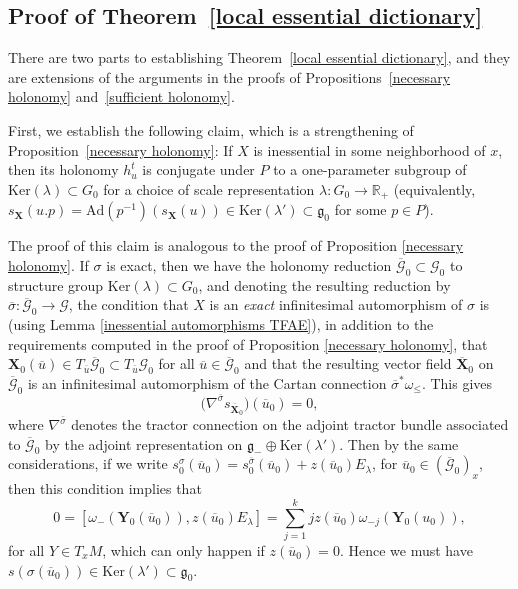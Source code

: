 \documentclass[pdftex]{sigma}
\def\R{\mathbb{R}}
\def\g{\mathfrak{g}}
\def\Gbdle{\mathcal{G}}
\def\dsum{\oplus}
\theoremstyle{plain}
\theoremstyle{definition}
\begin{document}
\subsection{Proof of Theorem~\ref{local essential dictionary}} \label{section4.3}

There are two parts to establishing Theorem~\ref{local essential dictionary}, and they are extensions of the arguments in the proofs of Propositions~\ref{necessary holonomy} and~\ref{sufficient holonomy}.

First, we establish the following claim, which is a strengthening of Proposition~\ref{necessary holonomy}: If $X$ is inessential in some neighborhood of $x$, then its holonomy $h_u^t$ is conjugate under $P$ to a one-parameter subgroup of $\mathrm{Ker}(\lambda) \subset G_0$ for a choice of scale representation $\lambda: G_0 \rightarrow \R_+$ (equivalently, $s_{\mathbf{X}}(u.p) = \mathrm{Ad}(p^{-1})(s_{\mathbf{X}}(u)) \in \mathrm{Ker}(\lambda') \subset \g_0$ for some $p \in P$).

The proof of this claim is analogous to the proof of Proposition \ref{necessary holonomy}. If $\sigma$ is exact, then we have the holonomy reduction $\overline{\Gbdle}_0 \subset \Gbdle_0$ to structure group $\mathrm{Ker}(\lambda) \subset G_0$, and denoting the resulting reduction by $\overline{\sigma}: \overline{\Gbdle}_0 \rightarrow \Gbdle$, the condition that $X$ is an \emph{exact} inf\/initesimal automorphism of $\sigma$ is (using Lemma \ref{inessential automorphisms TFAE}), in addition to the requirements computed in the proof of Proposition \ref{necessary holonomy}, that $\mathbf{X}_0(\overline{u}) \in T_{\overline{u}}\overline{\Gbdle}_0 \subset T_{\overline{u}}\Gbdle_0$ for all $\overline{u} \in \overline{\Gbdle}_0$ and that the resulting vector f\/ield $\overline{\mathbf{X}}_0$ on $\overline{\Gbdle}_0$ is an inf\/initesimal automorphism of the Cartan connection $\overline{\sigma}^*\omega_{\leq}$. This gives
\[
\big(\nabla^{\overline{\sigma}} s_{\overline{\mathbf{X}}_0}\big)(\overline{u}_0) = 0,
\]
where $\nabla^{\overline{\sigma}}$ denotes the tractor connection on the adjoint tractor bundle associated to $\overline{\Gbdle}_0$ by the adjoint representation on $\g_- \dsum \mathrm{Ker}(\lambda')$. Then by the same considerations, if we write $s^{\sigma}_0(\overline{u}_0) = s^{\overline{\sigma}}_0(\overline{u}_0) + z(\overline{u}_0)E_{\lambda}$, for $\overline{u}_0 \in (\overline{\Gbdle}_0)_x$, then this condition implies that
\[
0 = [\omega_-(\mathbf{Y}_0(\overline{u}_0)),z(\overline{u}_0)E_{\lambda}] = \sum_{j=1}^k jz(\overline{u}_0)\omega_{-j}(\mathbf{Y}_0(u_0)),
\]
for all $Y \!\in\! T_xM$, which can only happen if $z(\overline{u}_0) = 0$. Hence we must have $s(\sigma(\overline{u}_0)) \!\in\! \mathrm{Ker}(\lambda') \!\subset\! \g_0$.
\end{document}
